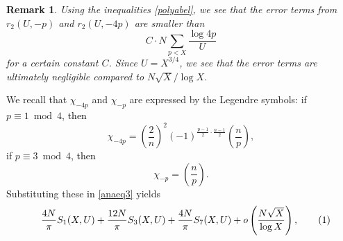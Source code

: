 \documentclass[a4paper, 11pt]{article}
\newtheorem{rem}[defn]{Remark}
\theoremstyle{plain}
\newcommand{\?}{\textcolor{red}{??}}
\begin{document}
\begin{rem}
Using the inequalities \eqref{polyabel}, 
we see that the error terms from $r_2(U,-p)$ and $r_2(U,-4p)$ are smaller than 
\[
C \cdot N \sum_{p < X} \frac{\log 4p}{U}
\]
for a certain constant $C$. Since $U=X^{3/4}$, we see that the error terms are ultimately negligible compared to $N\sqrt{X}/ \log X$.
    
\end{rem}
We recall that ${\chi}_{-4p}$ and ${\chi}_{-p}$ are expressed by the Legendre symbols: 
 if $p \equiv 1\bmod 4$\textcolor{black}{, then}
    \[
    {\chi}_{-4p}= \left( \frac{2}{n} \right)^2(-1)^{\frac{p-1}{2} \cdot \frac{n-1}{2}} \left( \frac{n}{p} \right),
    \]
if $p \equiv 3 \bmod 4$\textcolor{black}{, then}
     \[
    {\chi}_{-p}= \left( \frac{n}{p} \right).
    \]
Substituting these \textcolor{black}{in} \eqref{anaeq3} yields
\begin{align*}
\label{anaeq4}
   && \frac{4N}{\pi}S_1(X,U) +  \frac{12N}{\pi} S_3(X,U)
   + \frac{4N}{\pi}  S_7(X,U)
    + o \left( \frac{N\sqrt{X}}{\log X} \right),
     \stepcounter{equation}\tag{\theequation} 
\end{align*}
\end{document}
